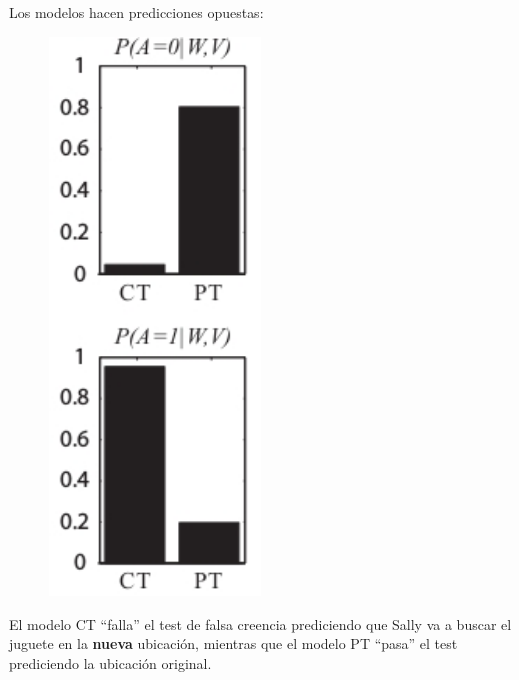 \documentclass{beamer}
\begin{document}
\begin{frame}

Los modelos hacen predicciones opuestas:
%

%


\begin{minipage}{0.5\textwidth}
\begin{figure}[H]
	\includegraphics[width=0.5\textwidth]{imagenes/fig_b.jpg}
\end{figure}
\end{minipage} \hfill
\begin{minipage}{0.45\textwidth}
El modelo CT ``falla''   el test de falsa creencia prediciendo que Sally va a buscar el juguete en la \textbf{nueva} ubicación, mientras que el modelo PT ``pasa''   el test prediciendo la ubicación original.
\end{minipage}

\end{frame}
\end{document}
